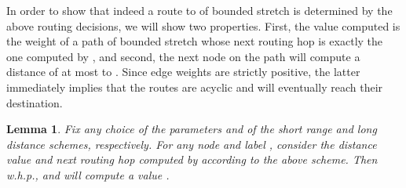 \documentclass[letterpaper,11pt]{article}
\newtheorem{lemma}[theorem]{Lemma}
\begin{document}
In order to show that indeed a route to  of bounded stretch is determined by
the above routing decisions, we will show two properties. First, the value 
computed is the weight of a path of bounded stretch whose next routing hop 
is exactly the one computed by , and second, the next node  on the path
will compute a distance of at most  to . Since edge weights
are strictly positive, the latter immediately implies that the routes are
acyclic and will eventually reach their destination.
\begin{lemma}\label{lemma:d}
Fix any choice of the parameters  and  of the short range and long
distance schemes, respectively. For any node  and label ,
consider the distance value  and next routing hop  computed by 
according to the above scheme. Then w.h.p.,  and 
will compute a value .
\end{lemma}
\end{document}
